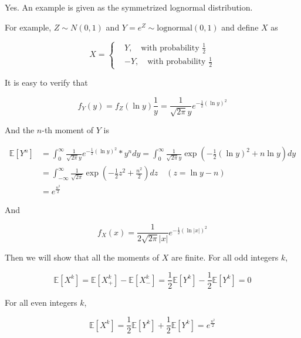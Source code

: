 \documentclass{article}
\begin{document}
Yes. An example is given as the symmetrized lognormal distribution.

For example, $Z \sim N(0,1)$ and $Y = e^Z \sim \text{lognormal}(0,1)$ and define $X$ as 

\begin{equation}
    X = \left\{  \begin{aligned}
        &Y,\quad \text{with probability } \frac{1}{2} \\
        &-Y, \quad \text{with probability } \frac{1}{2}
    \end{aligned}\right.
\end{equation}

It is easy to verify that 

\begin{equation}
    f_Y(y) = f_Z(\ln y ) \frac {1}{y} = \frac{1}{\sqrt{2\pi} y} e^{-\frac{1}{2} (\ln y)^2}
\end{equation}

And the $n$-th moment of $Y$ is 

\begin{equation}
    \begin{aligned}
        \mathbb{E}[Y^n] & = \int_{0}^{\infty}  \frac{1}{\sqrt{2\pi} y} e^{-\frac{1}{2} (\ln y)^2} * y^n dy = \int_{0}^{\infty} \frac{1}{\sqrt{2\pi} y} \exp \left( -\frac{1}{2 }(\ln y)^2 + n\ln y\right) dy \\
        & = \int_{-\infty}^{\infty} \frac{1}{\sqrt{2\pi}} \exp\left(-\frac{1}{2} z^2 + \frac{n^2}{2}\right) dz \quad \left(z=\ln y - n\right) \\
        & = e^{\frac{n^2}{2}}
    \end{aligned}
\end{equation}

And 

\begin{equation}
    f_X(x) = \frac{1}{2\sqrt{2\pi} |x|} e^{-\frac{1}{2} (\ln |x|)^2}
\end{equation}


Then we will show that all the moments of $X$ are finite. For all odd integers $k$,

\begin{equation}
    \mathbb{E}[X^k] = \mathbb{E}[X^k_+] - \mathbb{E}[X^k_-] = \frac{1}{2} \mathbb{E}[Y^k] -  \frac{1}{2} \mathbb{E}[Y^k] = 0
\end{equation}

For all even integers $k$,

\begin{equation}
    \mathbb{E}[X^k] = \frac{1}{2} \mathbb{E}[Y^k] +  \frac{1}{2} \mathbb{E}[Y^k] = e^{\frac{n^2}{2}}
\end{equation}
\end{document}

